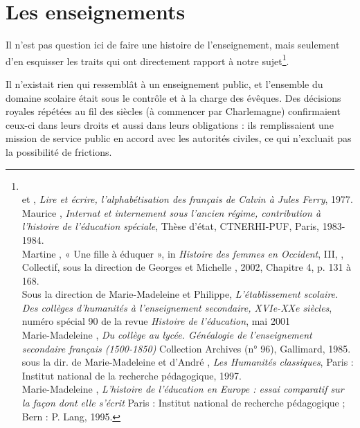  

\section{Les enseignements}

    
   Il n'est pas question ici de faire une histoire de l'enseignement, mais seulement d'en esquisser les traits qui ont directement rapport à notre sujet\footnote{\\ et , \emph{Lire et écrire, l'alphabétisation des français de Calvin à Jules Ferry}, 1977.
\\Maurice {}, \emph{Internat et internement sous l'ancien régime, contribution à l'histoire de l'éducation spéciale}, Thèse d'état, CTNERHI-PUF, Paris, 1983-1984.
\\Martine {}, {« Une fille à éduquer », in \emph{Histoire des femmes en Occident}, III, }, Collectif, sous la direction de Georges  et Michelle , 2002, Chapitre 4, p. 131 à 168.
\\Sous la direction de Marie-Madeleine  et Philippe, \emph{L’établissement scolaire. Des collèges d'humanités à l'enseignement secondaire, XVIe-XXe siècles}, numéro spécial 90 de la revue \emph{Histoire de l’éducation}, mai 2001
\\ Marie-Madeleine , \emph{Du collège au lycée. Généalogie de l'enseignement secondaire français (1500-1850)}
Collection Archives (n° 96), Gallimard, 1985.
\\sous la dir. de Marie-Madeleine  et d'André , \emph{Les Humanités classiques}, Paris : Institut national de la recherche pédagogique, 1997.
\\Marie-Madeleine ,	\emph{L'histoire de l'éducation en Europe : essai comparatif sur la façon dont elle s'écrit} Paris : Institut national de recherche pédagogique ; Bern : P. Lang, 1995. }.

 
Il n'existait rien qui ressemblât à un enseignement public, et l'ensemble du domaine scolaire était sous le contrôle et à la charge des évêques. Des décisions royales répétées au fil des siècles (à commencer par Charlemagne) confirmaient ceux-ci dans leurs droits et aussi dans leurs obligations : ils remplissaient une mission de service public en accord avec les autorités civiles, ce qui n'excluait pas la possibilité de frictions. 

